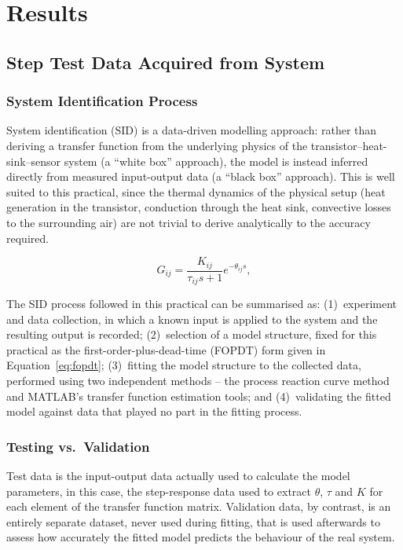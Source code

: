 \section{Results}

\subsection{Step Test Data Acquired from System}

\subsubsection*{System Identification Process}

System identification (SID) is a data-driven modelling approach: rather
than deriving a transfer function from the underlying physics of the
transistor--heat-sink--sensor system (a ``white box'' approach), the model
is instead inferred directly from measured input-output data (a
``black box'' approach). This is well suited to this practical, since the
thermal dynamics of the physical setup (heat generation in the transistor,
conduction through the heat sink, convective losses to the surrounding
air) are not trivial to derive analytically to the accuracy required.
 
\begin{equation}
    G_{ij} = \frac{K_{ij}}{\tau_{ij}s+1}e^{-\theta_{ij}s},
    \label{eq:fopdt}
\end{equation}
 
The SID process followed in this practical can be summarised as:
(1)~experiment and data collection, in which a known input is applied to
the system and the resulting output is recorded; (2)~selection of a model
structure, fixed for this practical as the first-order-plus-dead-time
(FOPDT) form given in Equation~\eqref{eq:fopdt}; (3)~fitting the model
structure to the collected data, performed using two independent methods
-- the process reaction curve method and MATLAB's transfer function
estimation tools; and (4)~validating the fitted model against data that
played no part in the fitting process.

\subsubsection*{Testing vs.\ Validation}

Test data is the input-output data actually used to calculate the model parameters, in this case, the
step-response data used to extract $\theta$, $\tau$ and $K$ for each
element of the transfer function matrix. Validation data, by contrast, is
an entirely separate dataset, never used during fitting, that is used
afterwards to assess how accurately the fitted model predicts the
behaviour of the real system.
 
